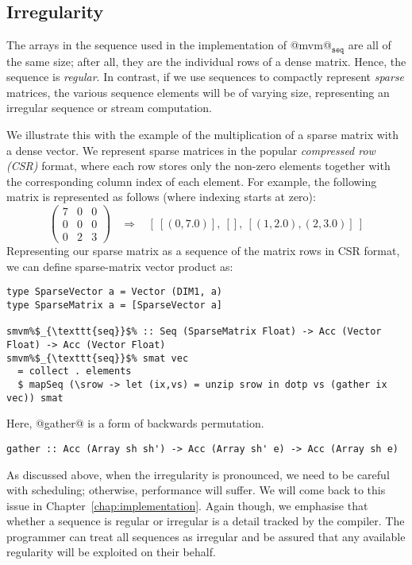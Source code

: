 \subsection{Irregularity}
\label{sec:irregularity}

The arrays in the sequence used in the implementation of @mvm@$_{\texttt{seq}}$ are all of the same size; after all, they are the individual rows of a dense matrix. Hence, the sequence is \emph{regular}. In contrast, if we use sequences to compactly represent \emph{sparse} matrices, the various sequence elements will be of varying size, representing an irregular sequence or stream computation.

We illustrate this with the example of the multiplication of a sparse matrix with a dense vector. We represent sparse matrices in the popular \emph{compressed row (CSR)} format, where each row stores only the non-zero elements together with the corresponding column index of each element. For example, the following matrix is represented as follows (where indexing starts at zero):
%
\[
\left(
\begin{array}{ccc}
  7 & 0 & 0 \\
  0 & 0 & 0 \\
  0 & 2 & 3
\end{array} \right)
~~~~ \Rightarrow
~~~~ [~[(0,7.0)],~[],~[(1,2.0),(2,3.0)]~]
\]
%
Representing our sparse matrix as a sequence of the matrix rows in CSR format,
we can define sparse-matrix vector product as:
%
\begin{lstlisting}
type SparseVector a = Vector (DIM1, a)
type SparseMatrix a = [SparseVector a]

smvm%$_{\texttt{seq}}$% :: Seq (SparseMatrix Float) -> Acc (Vector Float) -> Acc (Vector Float)
smvm%$_{\texttt{seq}}$% smat vec
  = collect . elements
  $ mapSeq (\srow -> let (ix,vs) = unzip srow in dotp vs (gather ix vec)) smat
\end{lstlisting}
%
Here, @gather@ is a form of backwards permutation.
%
\begin{lstlisting}
gather :: Acc (Array sh sh') -> Acc (Array sh' e) -> Acc (Array sh e)
\end{lstlisting}

As discussed above, when the irregularity is pronounced, we need to be careful with scheduling; otherwise, performance will suffer. We will come back to this issue in Chapter~\ref{chap:implementation}. Again though, we emphasise that whether a sequence is regular or irregular is a detail tracked by the compiler. The programmer can treat all sequences as irregular and be assured that any available regularity will be exploited on their behalf.

